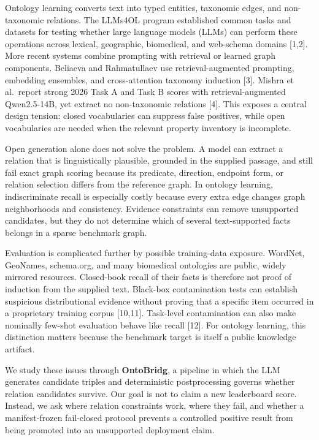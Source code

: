\documentclass[
]{article}
\begin{document}
Ontology learning converts text into typed entities, taxonomic edges,
and non-taxonomic relations. The LLMs4OL program established common
tasks and datasets for testing whether large language models (LLMs) can
perform these operations across lexical, geographic, biomedical, and
web-schema domains {[}1,2{]}. More recent systems combine prompting with
retrieval or learned graph components. Beliaeva and Rahmatullaev use
retrieval-augmented prompting, embedding ensembles, and cross-attention
taxonomy induction {[}3{]}. Mishra et al.~report strong 2026 Task A and
Task B scores with retrieval-augmented Qwen2.5-14B, yet extract no
non-taxonomic relations {[}4{]}. This exposes a central design tension:
closed vocabularies can suppress false positives, while open
vocabularies are needed when the relevant property inventory is
incomplete.

Open generation alone does not solve the problem. A model can extract a
relation that is linguistically plausible, grounded in the supplied
passage, and still fail exact graph scoring because its predicate,
direction, endpoint form, or relation selection differs from the
reference graph. In ontology learning, indiscriminate recall is
especially costly because every extra edge changes graph neighborhoods
and consistency. Evidence constraints can remove unsupported candidates,
but they do not determine which of several text-supported facts belongs
in a sparse benchmark graph.

Evaluation is complicated further by possible training-data exposure.
WordNet, GeoNames, schema.org, and many biomedical ontologies are
public, widely mirrored resources. Closed-book recall of their facts is
therefore not proof of induction from the supplied text. Black-box
contamination tests can establish suspicious distributional evidence
without proving that a specific item occurred in a proprietary training
corpus {[}10,11{]}. Task-level contamination can also make nominally
few-shot evaluation behave like recall {[}12{]}. For ontology learning,
this distinction matters because the benchmark target is itself a public
knowledge artifact.

We study these issues through \textbf{OntoBridg}, a pipeline in which
the LLM generates candidate triples and deterministic postprocessing
governs whether relation candidates survive. Our goal is not to claim a
new leaderboard score. Instead, we ask where relation constraints work,
where they fail, and whether a manifest-frozen fail-closed protocol
prevents a controlled positive result from being promoted into an
unsupported deployment claim.
\end{document}
